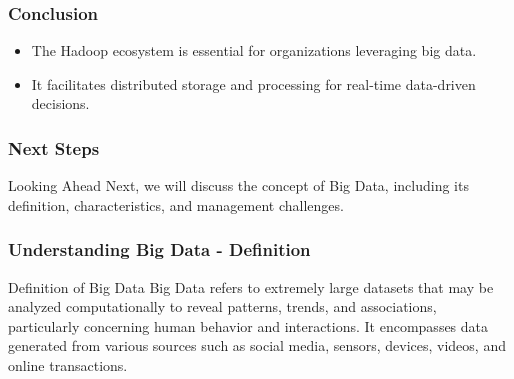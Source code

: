 \documentclass[aspectratio=169]{beamer}
\begin{document}
\begin{frame}[fragile]
    \frametitle{Conclusion}
    \begin{itemize}
        \item The Hadoop ecosystem is essential for organizations leveraging big data.
        \item It facilitates distributed storage and processing for real-time data-driven decisions.
    \end{itemize}
\end{frame}

\begin{frame}[fragile]
    \frametitle{Next Steps}
    \begin{block}{Looking Ahead}
        Next, we will discuss the concept of Big Data, including its definition, characteristics, and management challenges.
    \end{block}
\end{frame}

\begin{frame}[fragile]
    \frametitle{Understanding Big Data - Definition}
    \begin{block}{Definition of Big Data}
        Big Data refers to extremely large datasets that may be analyzed computationally to reveal patterns, trends, and associations, particularly concerning human behavior and interactions. It encompasses data generated from various sources such as social media, sensors, devices, videos, and online transactions.
    \end{block}
\end{frame}
\end{document}

